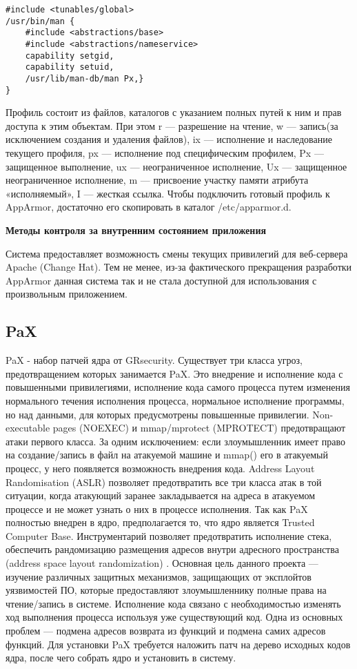 \bigskip
\begin{lstlisting}
#include <tunables/global>  
/usr/bin/man { 
	#include <abstractions/base>
	#include <abstractions/nameservice>
	capability setgid,
	capability setuid,
	/usr/lib/man-db/man Px,} 
}
\end{lstlisting}

\bigskip
Профиль состоит из файлов, каталогов с указанием полных 
путей к ним и прав доступа к этим объектам. При этом r — 
разрешение на чтение, w — запись(за исключением создания 
и удаления файлов), ix — исполнение и наследование текущего 
профиля, px — исполнение под специфическим профилем, Px — 
защищенное выполнение, ux — неограниченное исполнение, 
Ux — защищенное неограниченное исполнение, m — присвоение 
участку памяти атрибута «исполняемый», I — жесткая ссылка. 
Чтобы подключить готовый профиль к AppArmor, достаточно его 
скопировать в каталог /etc/apparmor.d. 

\bigskip
{\bfseries Методы контроля 
за внутренним состоянием приложения} 

Система предоставляет возможность смены
текущих привилегий для веб-сервера Apache
(Change Hat). Тем не менее, из-за фактического
прекращения разработки AppArmor данная 
система так и не стала доступной для использования
с произвольным приложением. 



\bigskip
\subsection{PaX} 

PaX - набор патчей ядра от GRsecurity. 
Существует три класса угроз, предотвращением которых 
занимается PaX. Это внедрение и исполнение кода с 
повышенными привилегиями, исполнение кода самого 
процесса путем изменения нормального течения 
исполнения процесса, нормальное исполнение программы, 
но над данными, для которых предусмотрены повышенные 
привилегии. Non-executable pages (NOEXEC) и mmap/mprotect 
(MPROTECT) предотвращают атаки первого класса. За одним 
исключением: если злоумышленник имеет право на 
создание/запись в файл на атакуемой машине и mmap() 
его в атакуемый процесс, у него появляется возможность 
внедрения кода. Address Layout Randomisation (ASLR) 
позволяет предотвратить все три класса атак в той 
ситуации, когда атакующий заранее закладывается на 
адреса в атакуемом процессе и не может узнать о них 
в процессе исполнения. Так как PaX полностью внедрен 
в ядро, предполагается то, что ядро является Trusted 
Computer Base. Инструментарий позволяет предотвратить 
исполнение стека, обеспечить рандомизацию 
размещения адресов внутри адресного пространства 
(address space layout randomization) . 
Основная цель данного проекта — изучение различных защитных 
механизмов, защищающих от эксплойтов уязвимостей ПО, которые 
предоставляют злоумышленнику полные права на чтение/запись в 
системе. Исполнение кода связано с необходимостью изменять 
ход выполнения процесса используя уже существующий код. Одна 
из основных проблем — подмена адресов возврата из функций и 
подмена самих адресов функций. Для установки PaX требуется 
наложить патч на дерево исходных кодов ядра, после чего собрать 
ядро и установить в систему. 

